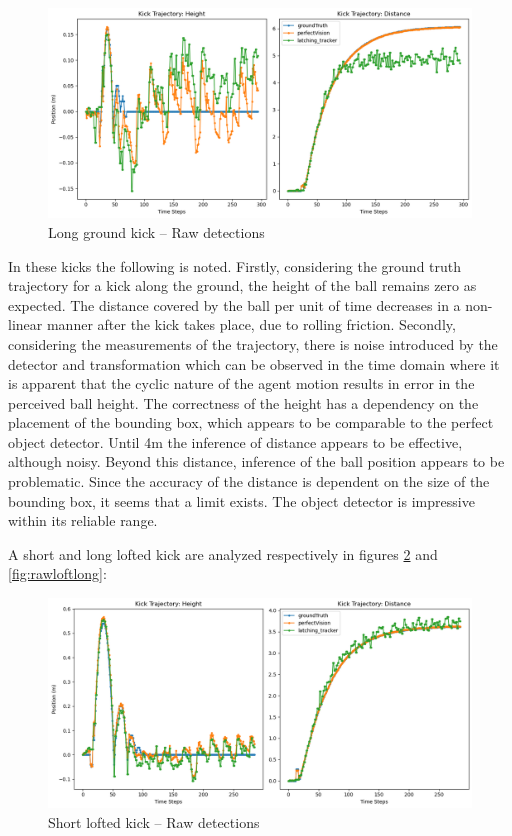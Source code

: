 \documentclass[a4paper,twoside,12pt]{report}
\begin{document}
\begin{figure}[h!]
\begin{center}
\includegraphics[width=14cm]{images/raw_ground_long.png}
\caption{Long ground kick -- Raw detections}
\label{fig:rawgroundlong}
\end{center}
\end{figure}

In these kicks the following is noted. Firstly, considering the ground truth trajectory for a kick along the ground, the height of the ball remains zero as expected. The distance covered by the ball per unit of time decreases in a non-linear manner after the kick takes place, due to rolling friction. Secondly, considering the measurements of the trajectory, there is noise introduced by the detector and transformation which can be observed in the time domain where it is apparent that the cyclic nature of the agent motion results in error in the perceived ball height. The correctness of the height has a dependency on the placement of the bounding box, which appears to be comparable to the perfect object detector. Until 4m the inference of distance appears to be effective, although noisy. Beyond this distance, inference of the ball position appears to be problematic. Since the accuracy of the distance is dependent on the size of the bounding box, it seems that a limit exists. The object detector is impressive within its reliable range.

A short and long lofted kick are analyzed respectively in figures \ref{fig:rawloftshort} and \ref{fig:rawloftlong}:

\begin{figure}[h!]
\begin{center}
\includegraphics[width=14cm]{images/raw_loft_short.png}
\caption{Short lofted kick -- Raw detections}
\label{fig:rawloftshort}
\end{center}
\end{figure}
\end{document}
